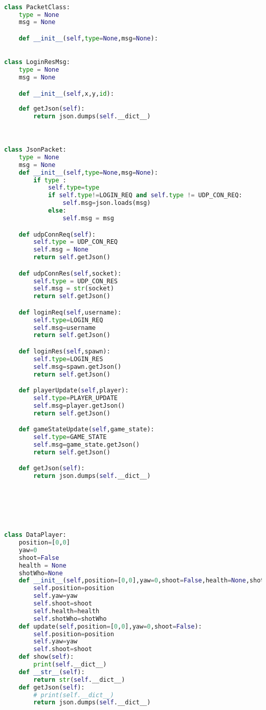 \begin{lstlisting}[language=Python]

class PacketClass:
    type = None
    msg = None

    def __init__(self,type=None,msg=None):
    

class LoginResMsg:
    type = None
    msg = None

    def __init__(self,x,y,id):
        
    def getJson(self):
        return json.dumps(self.__dict__)



class JsonPacket:
    type = None
    msg = None
    def __init__(self,type=None,msg=None):
        if type :
            self.type=type
            if self.type!=LOGIN_REQ and self.type != UDP_CON_REQ:
                self.msg=json.loads(msg)
            else:
                self.msg = msg

    def udpConnReq(self):
        self.type = UDP_CON_REQ
        self.msg = None
        return self.getJson()

    def udpConnRes(self,socket):
        self.type = UDP_CON_RES
        self.msg = str(socket)
        return self.getJson()

    def loginReq(self,username):
        self.type=LOGIN_REQ
        self.msg=username
        return self.getJson()

    def loginRes(self,spawn):
        self.type=LOGIN_RES
        self.msg=spawn.getJson()
        return self.getJson()

    def playerUpdate(self,player):
        self.type=PLAYER_UPDATE
        self.msg=player.getJson()
        return self.getJson()

    def gameStateUpdate(self,game_state):
        self.type=GAME_STATE
        self.msg=game_state.getJson()
        return self.getJson()

    def getJson(self):
        return json.dumps(self.__dict__)






class DataPlayer:
    position=[0,0]
    yaw=0
    shoot=False
    health = None
    shotWho=None
    def __init__(self,position=[0,0],yaw=0,shoot=False,health=None,shotWho=None):
        self.position=position
        self.yaw=yaw
        self.shoot=shoot
        self.health=health
        self.shotWho=shotWho
    def update(self,position=[0,0],yaw=0,shoot=False):
        self.position=position
        self.yaw=yaw
        self.shoot=shoot
    def show(self):
        print(self.__dict__)
    def __str__(self):
        return str(self.__dict__)
    def getJson(self):
        # print(self.__dict__)
        return json.dumps(self.__dict__)

    \end{lstlisting}

